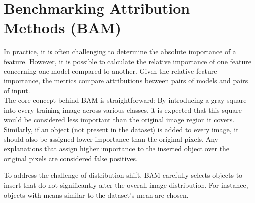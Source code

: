 \section{Benchmarking Attribution Methods (BAM) \cite{yang2019benchmarking}}

In practice, it is often challenging to determine the absolute importance of a feature. However, it is possible to calculate the relative importance of one feature concerning one model compared to another. Given the relative feature importance, the metrics compare attributions between pairs of models and pairs of input.\\

The core concept behind BAM is straightforward: By introducing a gray square into every training image across various classes, it is expected that this square would be considered less important than the original image region it covers. Similarly, if an object (not present in the dataset) is added to every image, it should also be assigned lower importance than the original pixels. Any explanations that assign higher importance to the inserted object over the original pixels are considered false positives.

To address the challenge of distribution shift, BAM carefully selects objects to insert that do not significantly alter the overall image distribution. For instance, objects with means similar to the dataset's mean are chosen. 

